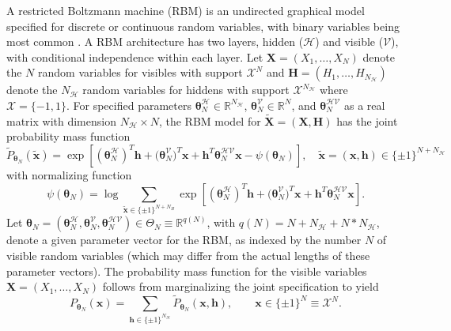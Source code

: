 \documentclass[numbib]{imamat}
\theoremstyle{theorem}
\theoremstyle{lemma}
\theoremstyle{example}
\theoremstyle{corollary}
\theoremstyle{definition}
\theoremstyle{remark}
\theoremstyle{approximation}
\theoremstyle{scheme}
\newcommand{\ak}[1]{{\color{blue} #1}}
\begin{document}
A restricted Boltzmann machine (RBM) is an undirected graphical model specified for discrete or continuous random variables, with binary variables being most common \citep[cf.~][]{smolensky1986information}. A RBM architecture has two layers, hidden (\(\mathcal{H}\)) and visible (\(\mathcal{V}\)), with conditional independence within each layer. Let \(\boldsymbol X = (X_1,\ldots,X_N)\) denote the \(N\) random variables for visibles with support \(\mathcal{X}^N\) and \(\boldsymbol H = (H_1,\ldots,H_{N_\mathcal{H}})\) denote the \(N_\mathcal{H}\) random variables for hiddens with support \(\mathcal{X}^{N_\mathcal{H}}\) where \(\mathcal{X} = \{-1,1\}\). For \ak{specified} parameters \(\boldsymbol \theta_N^{\mathcal{H}} \in \mathbb{R}^{N_\mathcal{H}}\), \(\boldsymbol \theta_N^{\mathcal{V}}\in \mathbb{R}^N\), and \(\boldsymbol \theta_N^{\mathcal{HV}}\) as a real matrix with dimension \(N_\mathcal{H} \times N\), the RBM model for \(\tilde{\boldsymbol X}=(\boldsymbol X,\boldsymbol H)\) has the joint probability mass function
\begin{equation}
\label{eq:RBM1}
\tilde{P}_{\boldsymbol \theta_N} (\tilde{\boldsymbol x}) = \exp\left[ (\boldsymbol \theta_N^{\mathcal{H}})^T \boldsymbol h + \boldsymbol (\boldsymbol \theta_N^{\mathcal{V}})^T \boldsymbol x + \boldsymbol h^T  \boldsymbol\theta_N^{\mathcal{HV}} \boldsymbol x - \psi(\boldsymbol \theta_N)\right], \quad \tilde{\boldsymbol x} = (\boldsymbol x, \boldsymbol h) \in \{\pm 1\}^{N+N_\mathcal{H}}
\end{equation}
with normalizing function
\[
\psi(\boldsymbol \theta_N) = \log \sum_{\tilde{\boldsymbol x} \in \{\pm 1\}^{N+N_H} } \exp\left[ (\boldsymbol \theta_N^{\mathcal{H}})^T \boldsymbol h + \boldsymbol (\boldsymbol \theta_N^{\mathcal{V}})^T \boldsymbol x + \boldsymbol h^T  \boldsymbol\theta_N^{\mathcal{HV}} \boldsymbol x\right].
\]
Let \(\boldsymbol \theta_N = (\boldsymbol \theta_N^{\mathcal{H}}, \boldsymbol \theta_N^{\mathcal{V}}, \boldsymbol\theta_N^{\mathcal{HV}} ) \in \Theta_N \equiv \mathbb{R}^{q(N)}\), with \(q(N) = N + N_\mathcal{H} + N*N_\mathcal{H}\), denote \ak{a given} parameter vector for the RBM, as indexed by the number \(N\) of visible random variables (which may differ from the actual lengths of these parameter vectors). The probability mass function for the visible variables \(\boldsymbol X = (X_1, \dots, X_N)\) follows from marginalizing the joint specification to yield
\begin{equation}
\label{eq:RBM2}
P_{\boldsymbol \theta_N} (\boldsymbol x) = \sum\limits_{\boldsymbol h \in \{\pm 1\}^{N_{\mathcal{H}}}} \tilde{P}_{\boldsymbol \theta_N} (\boldsymbol x, \boldsymbol h), \qquad \boldsymbol x \in \{\pm 1\}^{N}\equiv \mathcal{X}^N.
\end{equation}
\end{document}
